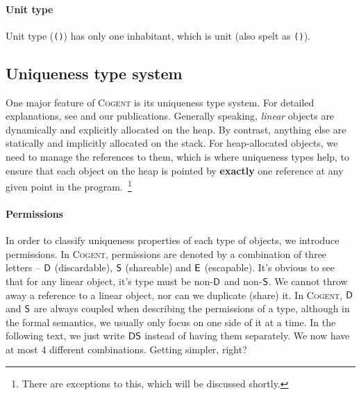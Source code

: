 \documentclass[a4paper]{article}
\newcommand{\inlinecogent}[1]{\lstinline[language=Cogent,basicstyle=\ttfamily\normalsize]{#1}\xspace}
\newcommand{\cogent}{\textsc{Cogent}\xspace}
\begin{document}
\paragraph{Unit type} Unit type (\inlinecogent{()}) has only one inhabitant, which is unit (also spelt as \inlinecogent{()}).

\subsection{Uniqueness type system}
One major feature of \cogent is its uniqueness type system. For detailed explanations, see \cite{Wadler_90} and our publications.
Generally speaking, \emph{linear} objects are dynamically and explicitly allocated on the heap. By contrast, anything else are
statically and implicitly allocated on the stack. For heap-allocated objects, we need to manage the references to them, which is
where uniqueness types help, to ensure that each object on the heap is pointed by \textbf{exactly} one reference at any
given point in the program.~\footnote{There are exceptions to this, which will be discussed shortly.}

\paragraph{Permissions} In order to classify uniqueness properties of each type of objects, we introduce permissions.
In \cogent, permissions are denoted by a combination of three letters -- $\mathsf{D}$ (discardable), $\mathsf{S}$ (shareable)
and $\mathsf{E}$ (escapable).
It's obvious to see that for any linear object, it's type must be non-$\mathsf{D}$ and non-$\mathsf{S}$. We cannot throw away
a reference to a linear object, nor can we duplicate (share) it. In \cogent, $\mathsf{D}$ and $\mathsf{S}$ are always coupled
when describing the permissions of a type, although in the formal semantics, we usually only focus on one side of it
at a time. In the following text, we just write $\mathsf{DS}$ instead of
having them separately. We now have at most 4 different combinations. Getting simpler, right?
\end{document}
